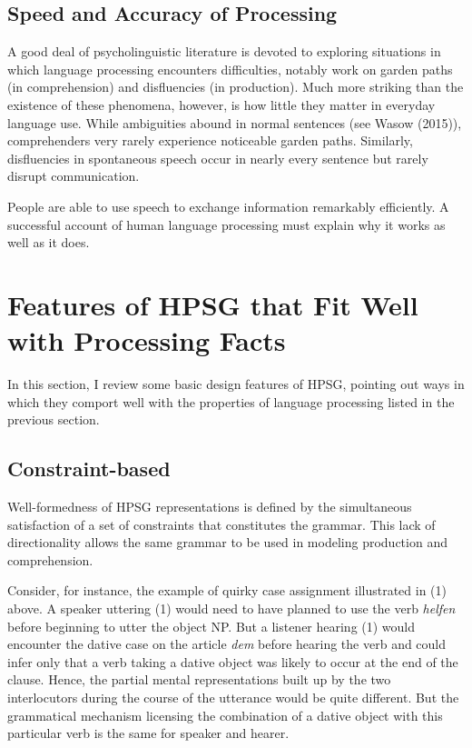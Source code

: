 \documentclass[a4paper]{article}
\begin{document}
\subsection{Speed and Accuracy of Processing}

A good deal of psycholinguistic literature is devoted to exploring situations in which language processing encounters difficulties, notably work on garden paths (in comprehension) and disfluencies (in production).  Much more striking than the existence of these phenomena, however, is how little they matter in everyday language use.  While ambiguities abound in normal sentences (see Wasow (2015)), comprehenders very rarely experience noticeable garden paths.  Similarly, disfluencies in spontaneous speech occur in nearly every sentence but rarely disrupt communication.  

People are able to use speech to exchange information remarkably efficiently.  A successful account of human language processing must explain why it works as well as it does.  

\section{Features of HPSG that Fit Well with Processing Facts}

In this section, I review some basic design features of HPSG, pointing out ways in which they comport well with the properties of language processing listed in the previous section.

\subsection{Constraint-based}

Well-formedness of HPSG representations is defined by the simultaneous satisfaction of a set of constraints that constitutes the grammar.  This lack of directionality allows the same grammar to be used in modeling production and comprehension.

Consider, for instance, the example of quirky case assignment illustrated in (1) above.  A speaker uttering (1) would need to have planned to use the verb {\it helfen} before beginning to utter the object NP.  But a listener hearing (1) would encounter the dative case on the article {\it dem} before hearing the verb and could infer only that a verb taking a dative object was likely to occur at the end of the clause.  Hence, the partial mental representations built up by the two interlocutors during the course of the utterance would be quite different.  But the grammatical mechanism licensing the combination of a dative object with this particular verb is the same for speaker and hearer. 
\end{document}
